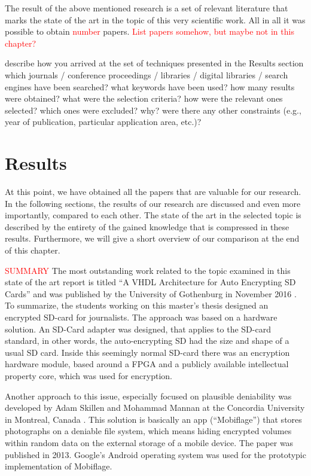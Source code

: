 \documentclass[12pt,a4paper,titlepage,oneside]{scrartcl}
\newcommand\todo[1]{\textcolor{red}{#1}}
\begin{document}
The result of the above mentioned research is a set of relevant literature that marks the state of the art in the topic of this very scientific work.
All in all it was possible to obtain \todo{number} papers.
\todo{List papers somehow, but maybe not in this chapter?}

describe how you arrived at the set of techniques presented in the Results section
which journals / conference proceedings / libraries / digital libraries / search engines have been searched?
what keywords have been used?
how many results were obtained?
what were the selection criteria? how were the relevant ones selected?
which ones were excluded? why?
were there any other constraints (e.g., year of publication, particular application area, etc.)?

\section{Results}
At this point, we have obtained all the papers that are valuable for our research.
In the following sections, the results of our research are discussed and even more importantly, compared to each other.
The state of the art in the selected topic is described by the entirety of the gained knowledge that is compressed in these results.
Furthermore, we will give a short overview of our comparison at the end of this chapter.


\todo{SUMMARY}
The most outstanding work related to the topic examined in this state of the art report is titled ``A VHDL Architecture for Auto Encrypting SD Cards'' and was published by the University of Gothenburg in November 2016 \cite{Davidsson2016}.
To summarize, the students working on this master's thesis designed an encrypted SD-card for journalists.
The approach was based on a hardware solution.
An SD-Card adapter was designed, that applies to the SD-card standard, in other words, the auto-encrypting SD had the size and shape of a usual SD card.
Inside this seemingly normal SD-card there was an encryption hardware module, based around a FPGA and a publicly available intellectual property core, which was used for encryption.

Another approach to this issue, especially focused on plausible deniability was developed by Adam Skillen and Mohammad Mannan at the Concordia University in Montreal, Canada \cite{skillen2013implementing}.
This solution is basically an app (``Mobiflage'') that stores photographs on a deniable file system, which means hiding encrypted volumes within random data on the external storage of a mobile device.
The paper was published in 2013.
Google's Android operating system was used for the prototypic implementation of Mobiflage.
\end{document}
